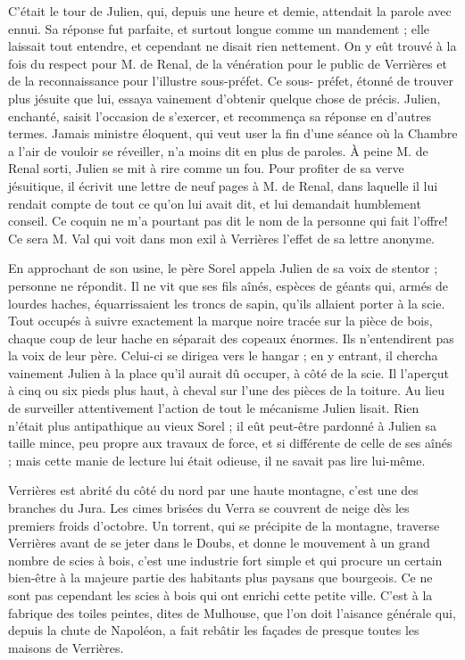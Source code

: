 \documentclass[english]{article}
\begin{document}
C’était le tour de Julien, qui, depuis une heure et demie, attendait la parole
avec ennui. Sa réponse fut parfaite, et surtout longue comme un mandement ; elle
laissait tout entendre, et cependant ne disait rien nettement. On y eût trouvé à
la fois du respect pour M. de Renal, de la vénération pour le public de
Verrières et de la reconnaissance pour l’illustre sous-préfet. Ce sous- préfet,
étonné de trouver plus jésuite que lui, essaya vainement d’obtenir quelque chose
de précis. Julien, enchanté, saisit l’occasion de s’exercer, et recommença sa
réponse en d’autres termes. Jamais ministre éloquent, qui veut user la fin d’une
séance où la Chambre a l’air de vouloir se réveiller, n’a moins dit en plus de
paroles. À peine M. de Renal sorti, Julien se mit à rire comme un fou. Pour
profiter de sa verve jésuitique, il écrivit une lettre de neuf pages à M. de
Renal, dans laquelle il lui rendait compte de tout ce qu’on lui avait dit, et
lui demandait humblement conseil. Ce coquin ne m’a pourtant pas dit le nom de la
personne qui fait l’offre! Ce sera M. Val qui voit dans mon exil à Verrières
l’effet de sa lettre anonyme.

En approchant de son usine, le père Sorel appela Julien de sa voix de stentor ;
personne ne répondit. Il ne vit que ses fils aînés, espèces de géants qui, armés
de lourdes haches, équarrissaient les troncs de sapin, qu’ils allaient porter à
la scie. Tout occupés à suivre exactement la marque noire tracée sur la pièce de
bois, chaque coup de leur hache en séparait des copeaux énormes. Ils
n’entendirent pas la voix de leur père. Celui-ci se dirigea vers le hangar ; en
y entrant, il chercha vainement Julien à la place qu’il aurait dû occuper, à
côté de la scie. Il l’aperçut à cinq ou six pieds plus haut, à cheval sur l’une
des pièces de la toiture. Au lieu de surveiller attentivement l’action de tout
le mécanisme Julien lisait. Rien n’était plus antipathique au vieux Sorel ; il
eût peut-être pardonné à Julien sa taille mince, peu propre aux travaux de
force, et si différente de celle de ses aînés ; mais cette manie de lecture lui
était odieuse, il ne savait pas lire lui-même.

Verrières est abrité du côté du nord par une haute montagne, c’est une des
branches du Jura. Les cimes brisées du Verra se couvrent de neige dès les
premiers froids d’octobre. Un torrent, qui se précipite de la montagne, traverse
Verrières avant de se jeter dans le Doubs, et donne le mouvement à un grand
nombre de scies à bois, c’est une industrie fort simple et qui procure un
certain bien-être à la majeure partie des habitants plus paysans que bourgeois.
Ce ne sont pas cependant les scies à bois qui ont enrichi cette petite ville.
C’est à la fabrique des toiles peintes, dites de Mulhouse, que l’on doit
l’aisance générale qui, depuis la chute de Napoléon, a fait rebâtir les façades
de presque toutes les maisons de Verrières.
\end{document}
